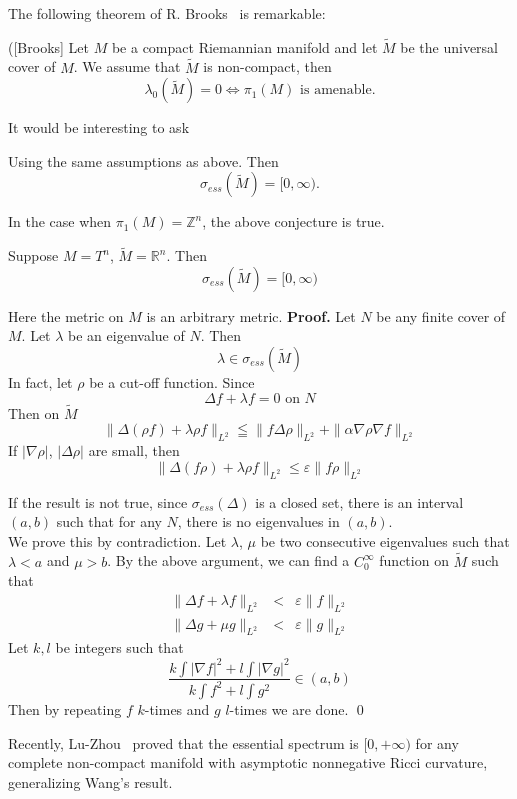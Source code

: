 The following theorem of R. Brooks~\cite{brooks} is remarkable:
\begin{theorem}
([Brooks] Let $M$ be a compact Riemannian manifold and let $\widetilde M$ be the
universal cover of $M$. We assume that $\widetilde M$ is non-compact, then
\[
\lambda_0(\widetilde M) = 0 \Leftrightarrow \pi_1(M) \mbox{ is amenable}.
\]
\end{theorem}

It would be interesting to ask
\begin{conjecture}
Using the same assumptions as above. Then
\[
\sigma_{ess}(\widetilde M) = [0, \infty).
\]
\end{conjecture}

In the case when $\pi_1(M) = \mathbb{Z}^n$, the above conjecture is true.

\begin{lemma}
Suppose $M = T^n$, $\widetilde M = \mathbb{R}^n$. Then
\[
\sigma_{ess}(\widetilde M) = [0, \infty)
\]
\end{lemma}
Here the metric on $M$ is an arbitrary metric.
{\bf Proof.}
Let $N$ be any finite cover of $M$. Let $\lambda$ be an eigenvalue of $N$. Then
\[
\lambda\in\sigma_{ess}(\widetilde M)
\]
In fact, let $\rho$ be a cut-off function. Since
\[
\Delta f + \lambda f = 0 \mbox{ on } N
\]
Then on $\widetilde M$
\[
\|\Delta(\rho f) + \lambda\rho f\|_{L^2} \leqq \|f\Delta\rho\|_{L^2} +
\|\alpha\nabla\rho\nabla f\|_{L^2}
\]
If $|\nabla\rho|$, $|\Delta\rho|$ are small, then
\[
\|\Delta(f\rho) + \lambda\rho f\|_{L^2} \leqslant \varepsilon \|f\rho\|_{L^2}
\]

If the result is not true, since $\sigma_{ess}(\Delta)$ is a closed set, there
is an interval $(a,b)$ such that for any $N$, there is no eigenvalues in
$(a,b)$.
\\

We prove this by contradiction. Let $\lambda$, $\mu$ be two consecutive
eigenvalues such that $\lambda < a$ and $\mu > b$. By the above argument, we
can find a $C_0^\infty$ function on $\widetilde M$ such that
\begin{eqnarray}
\nonumber \|\Delta f + \lambda f\|_{L^2} & < & \varepsilon\|f\|_{L^2} \\
\nonumber \|\Delta g + \mu g\|_{L^2} & < & \varepsilon\|g\|_{L^2}
\end{eqnarray}
Let $k,l$ be integers such that
\[
\frac{k\int|\nabla f|^2 + l\int|\nabla g|^2}{k\int f^2 + l\int g^2}\in(a,b)
\]
Then by repeating $f$ $k$-times and $g$ $l$-times we are done.
\qed


\begin{remark}
Recently, Lu-Zhou~\cite{lu-zhou} proved that the essential spectrum is $[0,+\infty)$ for any complete non-compact manifold with asymptotic nonnegative Ricci curvature, generalizing Wang's result.
\end{remark}






